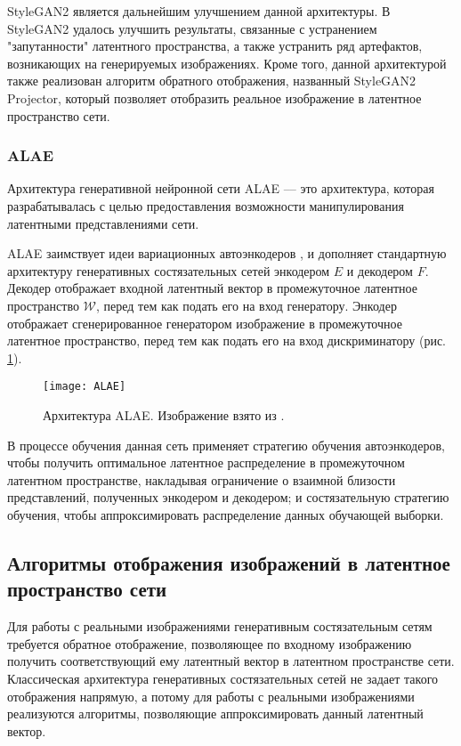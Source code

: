 StyleGAN2 \cite{karras2020stylegan2} является дальнейшим улучшением данной архитектуры.
В StyleGAN2 удалось улучшить результаты, связанные с устранением "запутанности" латентного пространства, а также устранить ряд артефактов, возникающих на генерируемых изображениях.
Кроме того, данной архитектурой также реализован алгоритм обратного отображения, названный StyleGAN2 Projector, который позволяет отобразить реальное изображение в латентное пространство сети.

\subsubsection{ALAE}
Архитектура генеративной нейронной сети ALAE \cite{ALAE} –-- это архитектура, которая разрабатывалась с целью предоставления возможности манипулирования латентными представлениями сети.

ALAE заимствует идеи вариационных автоэнкодеров \cite{kingma2014vae}, и дополняет стандартную архитектуру генеративных состязательных сетей энкодером $E$ и декодером $F$.
Декодер отображает входной латентный вектор в промежуточное латентное пространство $\mathcal W$, перед тем как подать его на вход генератору.
Энкодер отображает сгенерированное генератором изображение в промежуточное латентное пространство, перед тем как подать его на вход дискриминатору (рис. \ref{fig:alae}).

\begin{figure}[h]
\begin{center}
    \texttt{[image: ALAE]}
    \caption{Архитектура ALAE. Изображение взято из \cite{ALAE}.}
    \label{fig:alae}
\end{center}
\end{figure}

В процессе обучения данная сеть применяет стратегию обучения автоэнкодеров, чтобы получить оптимальное латентное распределение в промежуточном латентном пространстве, накладывая ограничение о взаимной близости представлений, полученных энкодером и декодером;
и состязательную стратегию обучения, чтобы аппроксимировать распределение данных обучающей выборки.


\subsection{Алгоритмы отображения изображений в латентное пространство сети}

Для работы с реальными изображениями генеративным состязательным сетям требуется обратное отображение, позволяющее по входному изображению получить соответствующий ему латентный вектор в латентном пространстве сети. 
Классическая архитектура генеративных состязательных сетей не задает такого отображения напрямую, а потому для работы с реальными изображениями реализуются алгоритмы, позволяющие аппроксимировать данный латентный вектор.

